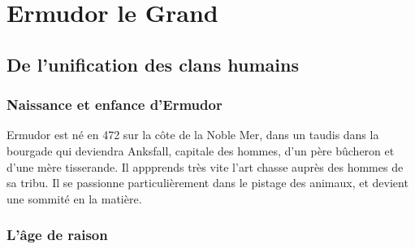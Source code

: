 
\section{Ermudor le Grand}
\subsection{De l'unification des clans humains}
\subsubsection{Naissance et enfance d'Ermudor}
Ermudor est né en 472 sur la côte de la Noble Mer, dans un taudis dans la bourgade qui deviendra Anksfall, capitale des hommes, d'un père bûcheron et d'une mère tisserande. Il appprends très vite l'art chasse auprès des hommes de sa tribu. Il se passionne particulièrement dans le pistage des animaux, et devient une sommité en la matière.
\subsubsection{L'âge de raison}